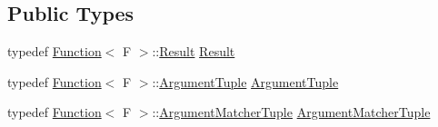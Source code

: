 \subsection*{Public Types}
\begin{DoxyCompactItemize}
\item 
typedef \hyperlink{structtesting_1_1internal_1_1Function}{Function}$<$ F $>$\+::\hyperlink{classtesting_1_1internal_1_1FunctionMockerBase_aa50abc4055b4d3a14ad64c317bccec8d}{Result} \hyperlink{classtesting_1_1internal_1_1FunctionMockerBase_aa50abc4055b4d3a14ad64c317bccec8d}{Result}
\item 
typedef \hyperlink{structtesting_1_1internal_1_1Function}{Function}$<$ F $>$\+::\hyperlink{classtesting_1_1internal_1_1FunctionMockerBase_a336432a07e544af4ffb8103603471ca3}{Argument\+Tuple} \hyperlink{classtesting_1_1internal_1_1FunctionMockerBase_a336432a07e544af4ffb8103603471ca3}{Argument\+Tuple}
\item 
typedef \hyperlink{structtesting_1_1internal_1_1Function}{Function}$<$ F $>$\+::\hyperlink{classtesting_1_1internal_1_1FunctionMockerBase_ab790bcb1dcf57fa6659365386723ae5a}{Argument\+Matcher\+Tuple} \hyperlink{classtesting_1_1internal_1_1FunctionMockerBase_ab790bcb1dcf57fa6659365386723ae5a}{Argument\+Matcher\+Tuple}
\end{DoxyCompactItemize}
